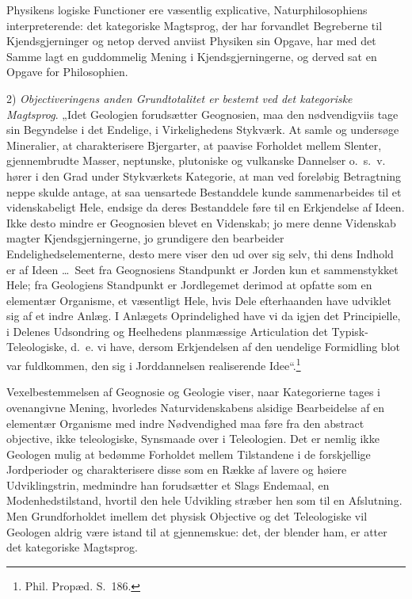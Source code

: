 \documentclass[12pt]{book}
\newcommand{\opage}[1]{\marginnote{\footnotesize\textit{[#1]}}}
\begin{document}
Physikens logiske Functioner ere væsentlig explicative, Naturphilosophiens interpreterende: det kategoriske Magtsprog, der har forvandlet Begreberne til Kjendsgjerninger og netop derved anviist Physiken sin Opgave, har med det Samme lagt en guddommelig Mening i Kjendsgjerningerne, og derved sat en Opgave for Philosophien.

2) \emph{Objectiveringens anden Grundtotalitet er bestemt ved det kategoriske Magtsprog}. „Idet Geologien forudsætter Geognosien, maa den nødvendigviis tage sin Begyndelse i det Endelige, i Virkelighedens Stykværk. At
\opage{430}samle og undersøge Mineralier, at charakterisere Bjergarter, at paavise Forholdet mellem Slenter, gjennembrudte Masser, neptunske, plutoniske og vulkanske Dannelser o.~s.~v. hører i den Grad under Stykværkets Kategorie, at man ved foreløbig Betragtning neppe skulde antage, at saa uensartede Bestanddele kunde sammenarbeides til et videnskabeligt Hele, endsige da deres Bestanddele føre til en Erkjendelse af Ideen. Ikke desto mindre er Geognosien blevet en Videnskab; jo mere denne Videnskab magter Kjendsgjerningerne, jo grundigere den bearbeider Endelighedselementerne, desto mere viser den ud over sig selv, thi dens Indhold er af Ideen \dots\ Seet fra Geognosiens Standpunkt er Jorden kun et sammenstykket Hele; fra Geologiens Standpunkt er Jordlegemet derimod at opfatte som en elementær Organisme, et væsentligt Hele, hvis Dele efterhaanden have udviklet sig af et indre Anlæg. I Anlægets Oprindelighed have vi da igjen det Principielle, i Delenes Udsondring og Heelhedens planmæssige Articulation det Typisk-Teleologiske, d.~e. vi have, dersom Erkjendelsen af den uendelige Formidling blot var fuldkommen, den sig i Jorddannelsen realiserende Idee“.\footnote{Phil. Propæd. S.~186.}%

Vexelbestemmelsen af Geognosie og Geologie viser, naar Kategorierne tages i ovenangivne Mening, hvorledes Naturvidenskabens alsidige Bearbeidelse af en elementær Organisme med indre Nødvendighed maa føre fra den abstract objective, ikke teleologiske, Synsmaade over i Teleologien. Det er nemlig ikke Geologen mulig at bedømme Forholdet mellem Tilstandene i de forskjellige Jordperioder og charakterisere disse som en Række af lavere og høiere Udviklingstrin, medmindre han forudsætter et Slags Endemaal, en Modenhedstilstand, hvortil den hele Udvikling stræber hen som til en Afslutning. Men Grundforholdet imellem det physisk Objective og det Teleologiske vil Geologen aldrig være istand til at
\opage{431}gjennemskue: det, der blender ham, er atter det kategoriske Magtsprog.
\end{document}
